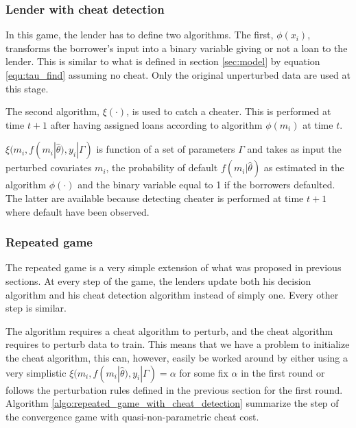\documentclass[12pt]{article} %
\begin{document}
\subsubsection{Lender with cheat detection}
In this game, the lender has to define two algorithms. The first, $\phi(x_i)$, transforms the borrower's input into a binary variable giving or not a loan to the lender. This is similar to what is defined in section \ref{sec:model} by equation \ref{equ:tau_find} assuming no cheat. Only the original unperturbed data are used at this stage. 

The second algorithm, $\xi(\cdot)$, is used to catch a cheater. This is performed at time $t+1$ after having assigned loans according to algorithm $\phi(m_i)$ at time $t$. 

$\xi(m_i, f(m_i | \hat{\theta}), y_i| \Gamma)$ is function of a set of parameters $\Gamma$ and takes as input the perturbed covariates $m_i$, the probability of default $f(m_i | \hat{\theta})$ as estimated in the algorithm $\phi(\cdot)$ and the binary variable equal to 1 if the borrowers defaulted. The latter are available because detecting cheater is performed at time $t+1$ where default have been observed. 

\subsubsection{Repeated game}
The repeated game is a very simple extension of what was proposed in previous sections. At every step of the game, the lenders update both his decision algorithm and his cheat detection algorithm instead of simply one. Every other step is similar. 

The algorithm requires a cheat algorithm to perturb, and the cheat algorithm requires to perturb data to train. This means that we have a problem to initialize the cheat algorithm, this can, however, easily be worked around by either using a very simplistic $\xi(m_i, f(m_i | \hat{\theta}), y_i| \Gamma) = \alpha$ for some fix $\alpha$ in the first round or follows the perturbation rules defined in the previous section for the first round. Algorithm \ref{algo:repeated_game_with_cheat_detection} summarize the step of the convergence game with quasi-non-parametric cheat cost. 
\end{document}
